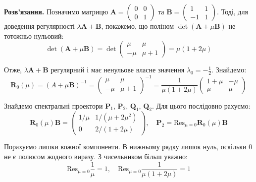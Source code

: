 \documentclass{hw_template}
\begin{document}
\textbf{Розв'язання.} Позначимо матрицю $\boldsymbol{A} = \begin{pmatrix}
    0 & 0 \\ 0 & 1
\end{pmatrix}$ та $\boldsymbol{B} = \begin{pmatrix}
    1 & 1 \\ -1 & 1
\end{pmatrix}$. Тоді, для доведення регулярності $\lambda\boldsymbol{A} + \boldsymbol{B}$, покажемо, що
поліном $\det(\boldsymbol{A}+\mu\boldsymbol{B})$ не тотожньо нульовий:
\begin{equation*}
    \det(\boldsymbol{A}+\mu\boldsymbol{B}) = \det \begin{pmatrix}
        \mu & \mu \\ -\mu & \mu+1
    \end{pmatrix} = \mu(1+2\mu)
\end{equation*}

Отже, $\lambda\boldsymbol{A} + \boldsymbol{B}$ регулярний і має ненульове власне
значення $\lambda_0 = -\frac{1}{2}$. Знайдемо:
\begin{equation*}
    \boldsymbol{R}_0(\mu) = (A+\mu\boldsymbol{B})^{-1} = \begin{pmatrix}
        \mu & \mu \\ -\mu & \mu+1
    \end{pmatrix}^{-1} = \frac{1}{\mu(1+2\mu)}\begin{pmatrix}
        1+\mu & -\mu \\
        \mu & \mu
    \end{pmatrix}
\end{equation*}

Знайдемо спектральні проектори $\boldsymbol{P}_1$, $\boldsymbol{P}_2$,
$\boldsymbol{Q}_1$, $\boldsymbol{Q}_2$. Для цього послідовно рахуємо:
\begin{equation*}
    \boldsymbol{R}_0(\mu)\boldsymbol{B} = \begin{pmatrix}
        1/\mu & 1/(\mu+2\mu^2) \\
        0 & 2/(1+2\mu)
    \end{pmatrix}, \quad \boldsymbol{P}_2 = \text{Res}_{\mu=0}\boldsymbol{R}_0(\mu)\boldsymbol{B}
\end{equation*}

Порахуємо лишки кожної компоненти. В нижньому рядку лишок нуль, оскільки $0$ не є 
полюсом жодного виразу. З чисельником більш уважно:
\begin{equation*}
    \text{Res}_{\mu=0}\frac{1}{\mu} = 1, \quad \text{Res}_{\mu=0}\frac{1}{\mu(1+2\mu)} = 1
\end{equation*}
\end{document}
